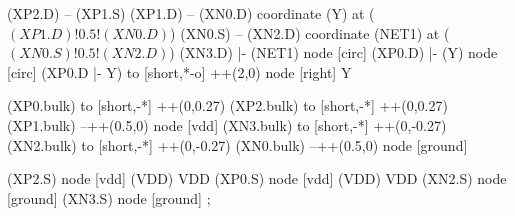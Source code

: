 \begin{circuitikz}[american]
	(XP2.D) -- (XP1.S)
	(XP1.D) -- (XN0.D)
	coordinate (Y) at ($(XP1.D)!0.5!(XN0.D)$)
	(XN0.S) -- (XN2.D) 
	coordinate (NET1) at ($(XN0.S)!0.5!(XN2.D)$)
	(XN3.D) |- (NET1) node [circ] {}
	(XP0.D) |- (Y) node [circ] {}
	(XP0.D |- Y) to [short,*-o] ++(2,0) node [right] {Y}
	
	
	(XP0.bulk) to [short,-*] ++(0,0.27)
	(XP2.bulk) to [short,-*] ++(0,0.27)
	(XP1.bulk) --++(0.5,0) node [vdd] {}	
	(XN3.bulk) to [short,-*] ++(0,-0.27)
	(XN2.bulk) to [short,-*] ++(0,-0.27)
	(XN0.bulk) --++(0.5,0) node [ground] {}


	(XP2.S) node [vdd] (VDD) {VDD}
	(XP0.S) node [vdd] (VDD) {VDD}
	(XN2.S) node [ground] {}
	(XN3.S) node [ground] {}
;

\end{circuitikz}
